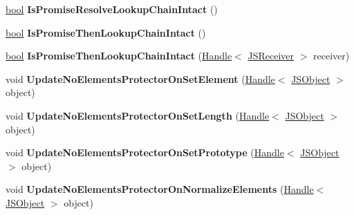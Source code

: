\begin{DoxyCompactItemize}
\mbox{\hyperlink{classbool}{bool}} {\bfseries Is\+Promise\+Resolve\+Lookup\+Chain\+Intact} ()
\item 
\mbox{\label{classv8_1_1internal_1_1Isolate_a61ab972b72be20b54dba054f7fb516c2}} 
\mbox{\hyperlink{classbool}{bool}} {\bfseries Is\+Promise\+Then\+Lookup\+Chain\+Intact} ()
\item 
\mbox{\label{classv8_1_1internal_1_1Isolate_a7a24d6c3cdd6e47a0c04a81c74ea334b}} 
\mbox{\hyperlink{classbool}{bool}} {\bfseries Is\+Promise\+Then\+Lookup\+Chain\+Intact} (\mbox{\hyperlink{classv8_1_1internal_1_1Handle}{Handle}}$<$ \mbox{\hyperlink{classv8_1_1internal_1_1JSReceiver}{J\+S\+Receiver}} $>$ receiver)
\item 
\mbox{\label{classv8_1_1internal_1_1Isolate_aa5fdc4b96d2ff0287c5b1bbf84465002}} 
void {\bfseries Update\+No\+Elements\+Protector\+On\+Set\+Element} (\mbox{\hyperlink{classv8_1_1internal_1_1Handle}{Handle}}$<$ \mbox{\hyperlink{classv8_1_1internal_1_1JSObject}{J\+S\+Object}} $>$ object)
\item 
\mbox{\label{classv8_1_1internal_1_1Isolate_ab31be77cafe67b28ea7cbca28b3b4be2}} 
void {\bfseries Update\+No\+Elements\+Protector\+On\+Set\+Length} (\mbox{\hyperlink{classv8_1_1internal_1_1Handle}{Handle}}$<$ \mbox{\hyperlink{classv8_1_1internal_1_1JSObject}{J\+S\+Object}} $>$ object)
\item 
\mbox{\label{classv8_1_1internal_1_1Isolate_ae8e4421939129f210dd9953e743b1712}} 
void {\bfseries Update\+No\+Elements\+Protector\+On\+Set\+Prototype} (\mbox{\hyperlink{classv8_1_1internal_1_1Handle}{Handle}}$<$ \mbox{\hyperlink{classv8_1_1internal_1_1JSObject}{J\+S\+Object}} $>$ object)
\item 
\mbox{\label{classv8_1_1internal_1_1Isolate_a3550e4891c4b660c57bc1e3a687bd71c}} 
void {\bfseries Update\+No\+Elements\+Protector\+On\+Normalize\+Elements} (\mbox{\hyperlink{classv8_1_1internal_1_1Handle}{Handle}}$<$ \mbox{\hyperlink{classv8_1_1internal_1_1JSObject}{J\+S\+Object}} $>$ object)
\item 
\mbox{\label{classv8_1_1internal_1_1Isolate_a3075990137e58fd255382265390309dd}} 

\end{DoxyCompactItemize}
